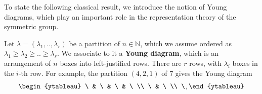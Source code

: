 \documentclass{scrartcl}
\newtheorem{theorem}{Theorem}
\theoremstyle{plain}
\theoremstyle{definition}
\newcommand{\R}{\mathbb{R}}
\newcommand{\N}{\mathbb{N}}
\newcommand{\1}[1]{1_{\{#1\}}}
\begin{document}


To state the following classical result, we introduce
the notion of Young diagrams, which play an important role in the
representation theory of the symmetric group.

Let $\lambda = (\lambda_1, .., \lambda_r)$ be a partition of $n \in \N$,
which we assume ordered as $\lambda_1 \ge \lambda_2 \ge .. \ge \lambda_r$.
%
We associate to it a \textbf{Young diagram}, which is an arrangement of $n$ boxes
into left-justified rows. There are $r$ rows, with $\lambda_i$ boxes in the $i$-th row.
%
For example, the partition $(4,2,1)$ of $7$ gives the Young diagram
\begin{align*}
  \begin{ytableau}
    \  & \  & \  & \ \\
    \   & \  \\
    \ 
  \end{ytableau}
\end{align*}
\end{document}
